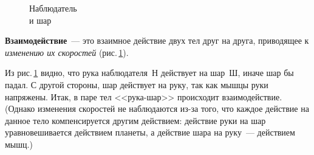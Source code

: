 \documentclass[main.tex]{subfiles}
\begin{document}
{%
\setlength\intextsep{0pt}
\begin{figure}
    \centering
    \caption{Наблюдатель\\ и шар}
    \label{fig:p31}
\end{figure}

\textbf{Взаимодействие}~--- это взаимное действие двух тел друг на друга, приводящее к \emph{изменению их скоростей} (рис.\,\ref{fig:p31}).


Из рис.\,\ref{fig:p31} видно, что рука наблюдателя~$\text{Н}$ действует на шар~Ш, иначе шар бы падал. С другой стороны, шар действует на руку, так как мышцы руки напряжены. Итак, в паре тел <<рука-шар>> происходит взаимодействие. (Однако изменения скоростей не наблюдаются из-за того, что каждое действие на данное тело компенсируется другим действием: действие руки на шар уравновешивается действием планеты, а действие шара на руку~--- действием мышц.)

}







\end{document}
